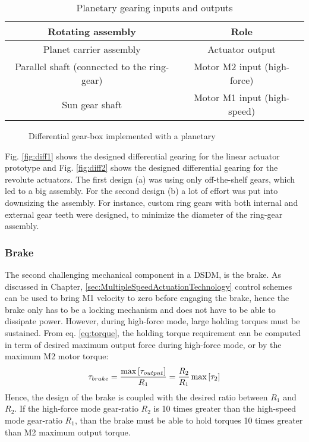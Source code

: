 \begin{table}[htbp]
	\centering
		\begin{tabular}{ c c }
			\hline
			Rotating assembly & Role \\
			\hline \hline
			Planet carrier assembly & Actuator output \\
			Parallel shaft (connected to the ring-gear) & Motor M2 input (high-force) \\
			Sun gear shaft          & Motor M1 input (high-speed) \\
			\hline
		\end{tabular}
	\caption{Planetary gearing inputs and outputs}
	\label{tab:PlanetaryGearingInputsAndOutput}
\end{table}

\begin{figure}[htp]
        \centering
				\hspace{+5pt}
        \caption{Differential gear-box implemented with a planetary}
				\label{fig:differnentials}
\end{figure}

Fig. \ref{fig:diff1} shows the designed differential gearing for the linear actuator prototype and Fig. \ref{fig:diff2} shows the designed differential gearing for the revolute actuators. The first design (a) was using only off-the-shelf gears, which led to a big assembly. For the second design (b) a lot of effort was put into downsizing the assembly. For instance, custom ring gears with both internal and external gear teeth were designed, to minimize the diameter of the ring-gear assembly.

\subsubsection{Brake}

The second challenging mechanical component in a DSDM, is the brake. As discussed in Chapter, \ref{sec:MultipleSpeedActuationTechnology} control schemes can be used to bring M1 velocity to zero before engaging the brake, hence the brake only has to be a locking mechanism and does not have to be able to dissipate power. However, during high-force mode, large holding torques must be sustained. From eq. \eqref{eq:torque}, the holding torque requirement can be computed in term of desired maximum output force during high-force mode, or by the maximum M2 motor torque: 
%
\begin{align}
	\tau_{brake} = \frac{ \operatornamewithlimits{max} \left[ \tau_{output} \right] }{R_1} = \frac{ R_2 }{ R_1 } \operatornamewithlimits{max} \left[  \tau_2 \right]
	\label{eq:brakelim}
\end{align}
%
Hence, the design of the brake is coupled with the desired ratio between $R_1$ and $R_2$. If the high-force mode gear-ratio $R_2$ is 10 times greater than the high-speed mode gear-ratio $R_1$, than the brake must be able to hold torques 10 times greater than M2 maximum output torque. 

